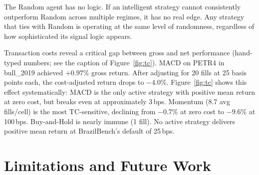 \documentclass{article}
\begin{document}
The Random agent has no logic. If an intelligent strategy cannot
consistently outperform Random across multiple regimes, it has no real
edge. Any strategy that ties with Random is operating at the same level
of randomness, regardless of how sophisticated its signal logic appears.

Transaction costs reveal a critical gap between gross and net
performance (hand-typed numbers; see the caption of Figure~\ref{fig:tc}). MACD on PETR4 in bull\_2019 achieved $+0.97\%$ gross
return. After adjusting for 20 fills at 25 basis points each, the
cost-adjusted return drops to $-4.0\%$. Figure~\ref{fig:tc} shows
this effect systematically: MACD is the only active strategy with
positive mean return at zero cost, but breaks even at approximately
3\,bps. Momentum (8.7 avg fills/cell) is the most TC-sensitive,
declining from $-0.7\%$ at zero cost to $-9.6\%$ at 100\,bps.
Buy-and-Hold is nearly immune (1 fill). No active strategy delivers
positive mean return at BrazilBench's default of 25\,bps.

\section{Limitations and Future Work}
\label{sec:limitations}
\end{document}
